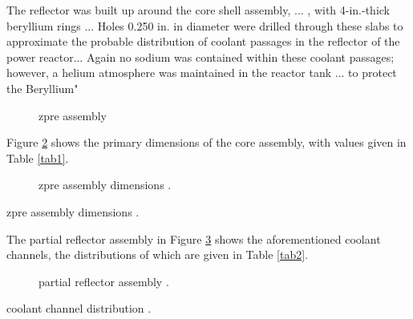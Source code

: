 \documentclass[ms,a4paper]{memoir}
\newcommand*{\msrarchive}{../../msr-archive}%
\begin{document}
The reflector was built up around the core shell assembly, ... , with 4-in.-thick beryllium rings ... Holes 0.250 in. in diameter were drilled through these slabs to approximate the probable distribution of coolant passages in the reflector of the power reactor... Again no sodium was contained within these coolant passages; however, a helium atmosphere was maintained in the reactor tank ... to protect the Beryllium"

\begin{figure}[H]
  \centering
  \caption{zpre assembly \parencite[Figure 1]{ornl-2536}}
  \label{fig1}
\end{figure}

Figure \ref{fig2} shows the primary dimensions of the core assembly, with values given in Table \ref{tab1}.

\begin{figure}[H]
  \centering
  \caption{zpre assembly dimensions \parencite[Figure 8]{ornl-2536}.}
  \label{fig2}
\end{figure}

\begin{table}[H]
  \centering
  \caption{zpre assembly dimensions \parencite[Table 4]{ornl-2536}.}
  \label{tab1}
\end{table}

The partial reflector assembly in Figure \ref{fig3} shows the aforementioned coolant channels, the distributions of which are given in Table \ref{tab2}.

\begin{figure}[H]
  \centering
  \caption{partial reflector assembly \parencite[Figure 3]{ornl-2536}.}
  \label{fig3}
\end{figure}

\begin{table}[H]
  \centering
  \caption{coolant channel distribution \parencite[Table 3]{ornl-2536}.}
  \label{tab2}
\end{table}
\end{document}
